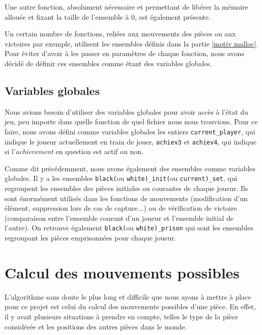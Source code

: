 \documentclass[a4paper]{article}
\begin{document}
Une autre fonction, absolument nécessaire et permettant de libérer la mémoire allouée et fixant la taille de l'ensemble à 0, est également présente.

\vspace{0.5cm}

Un certain nombre de fonctions, reliées aux mouvements des pièces ou aux victoires par exemple, utilisent les ensembles définis dans la partie \ref{motiv malloc}. Pour éviter d'avoir à les passer en paramètres de chaque fonction, nous avons décidé de définir ces ensembles comme étant des variables globales.

\subsection{Variables globales}
\label{var glob}

Nous avions besoin d'utiliser des variables globales pour avoir accès à l'état du jeu, peu importe dans quelle fonction de quel fichier nous nous trouvions. Pour ce faire, nous avons défini comme variables globales les entiers \verb|current_player|, qui indique le joueur actuellement en train de jouer, \verb|achiev3| et \verb|achiev4|, qui indique si l'\emph{achievement} en question est actif ou non.

Comme dit précédemment, nous avons également des ensembles comme variables globales. Il y a les ensembles \verb|black(|ou \verb|white)_init(|ou \verb|current)_set|, qui regroupent les ensembles des pièces initiales ou courantes de chaque joueur. Ils sont énormément utilisés dans les fonctions de mouvements (modification d'un élément, suppression lors de cas de capture...) ou de vérification de victoire (comparaison entre l'ensemble courant d'un joueur et l'ensemble initial de l'autre). On retrouve également \verb|black(|ou \verb|white)_prison| qui sont les ensembles regroupant les pièces emprisonnées pour chaque joueur.


\section{Calcul des mouvements possibles}
\label{mvts}
L'algorithme sans doute le plus long et difficile que nous ayons à mettre à place pour ce projet est celui du calcul des mouvements possibles d'une pièce. En effet, il y avait plusieurs situations à prendre en compte, telles le type de la pièce considérée et les positions des autres pièces dans le monde.
\end{document}
